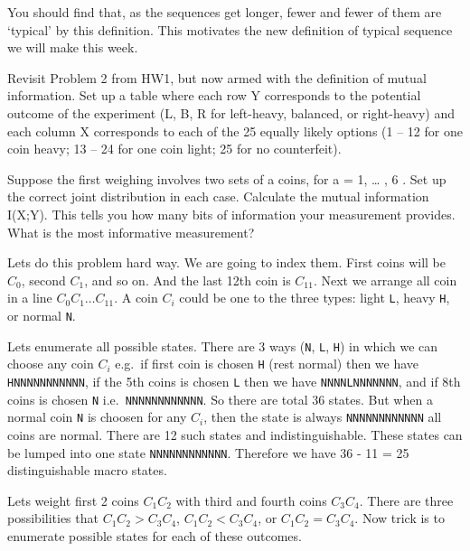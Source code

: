 \documentclass[answers]{exam}
\begin{document}
\begin{questions}

You should find that, as the sequences get longer, fewer and fewer of them are ‘typical’
by this definition. This motivates the new definition of typical sequence we will make
this week.

\bonusquestion[10] 
Revisit Problem 2 from HW1, but now armed with the definition of mutual
information. Set up a table where each row Y corresponds to the
potential outcome of the experiment (L, B, R for left-heavy, balanced,
or right-heavy) and each column X corresponds to each of the 25 equally
likely options (1 -- 12 for one coin heavy; 13 -- 24 for one coin light;
25 for no counterfeit).

Suppose the first weighing involves two sets of a coins, for a = 1,
\ldots{} , 6 . Set up the correct joint distribution in each case.
Calculate the mutual information I(X;Y). This tells you how many bits of
information your measurement provides. What is the most informative
measurement?

\begin{solution}
Lets do this problem hard way. We are going to index them. First coins
will be \(C_0\), second \(C_1\), and so on. And the last 12th coin is
\(C_{11}\). Next we arrange all coin in a line
\(C_0 C_1 \ldots C_{11}\). A coin \(C_i\) could be one to the three
types: light \texttt{L}, heavy \texttt{H}, or normal \texttt{N}.

Lets enumerate all possible states. There are 3 ways (\texttt{N},
\texttt{L}, \texttt{H}) in which we can choose any coin \(C_i\) e.g.~if
first coin is chosen \texttt{H} (rest normal) then we have
\texttt{HNNNNNNNNNNN}, if the 5th coins is chosen \texttt{L} then we
have \texttt{NNNNLNNNNNNN}, and if 8th coins is chosen \texttt{N}
i.e.~\texttt{NNNNNNNNNNNN}. So there are total 36 states. But when a
normal coin \texttt{N} is choosen for any \(C_i\), then the state is
always \texttt{NNNNNNNNNNNN} all coins are normal. There are 12 such
states and indistinguishable. These states can be lumped into one state
\texttt{NNNNNNNNNNNN}. Therefore we have 36 - 11 = 25 distinguishable
macro states.

Lets weight first 2 coins \(C_1C_2\) with third and fourth coins
\(C_3C_4\). There are three possibilities that \(C_1C_2 > C_3C_4\),
\(C_1C_2 < C_3C_4\), or \(C_1C_2 = C_3C_4\). Now trick is to enumerate
possible states for each of these outcomes.
\end{solution}

\end{questions}
\end{document}

